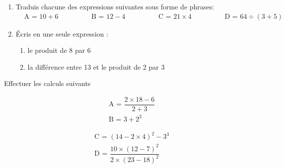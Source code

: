 \documentclass[12pt]{extarticle}
\begin{document}
{\begin{exercicebox}
    \begin{enumerate}
        \item Traduis chacune des expressions suivantes sous forme de phrases:
        \begin{align*}
            &\text{A = }10+6 \hspace{2cm}\text{B = }12-4\hspace{2cm}\text{C =
            }21\times4\hspace{2cm}\text{D = }64\div(3+5)
        \end{align*}
    \item Écris en une seule expression  :
        \begin{enumerate}
            \item le produit de 8 par 6
            \item la différence entre 13 et le produit de 2 par 3
        \end{enumerate}
    \end{enumerate}
\end{exercicebox}


\begin{exercicebox}
    Effectuer les calculs suivants \\
    \begin{minipage}{0.48\textwidth}
        \begin{align*}
            &\text{A = }\dfrac{2\times18-6}{2+3} \\
            &\text{B = } 3+2^2
        \end{align*}
    \end{minipage}
    \hfill
    \begin{minipage}{0.48\textwidth}
        \begin{align*}
            &\text{C = }(14-2\times4)^2-3^3 \\
            &\text{D = }\dfrac{10\times(12-7)^2}{2\times(23-18)^2} 
        \end{align*}
    \end{minipage}
\end{exercicebox}


}
\end{document}
